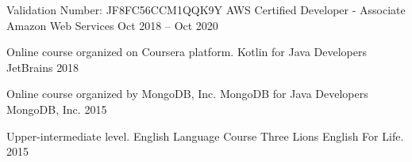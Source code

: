 

\begin{cventries}

  \cventry
    {Validation Number: JF8FC56CCM1QQK9Y} %
    {AWS Certified Developer - Associate} %
    {Amazon Web Services} %
    {Oct 2018 – Oct 2020} %
    {}
   
    
  \cventry
    {Online course organized on Coursera platform. } %
    {Kotlin for Java Developers} %
    {JetBrains} %
    {2018} %
    {}
    
  \cventry
    {Online course organized by MongoDB, Inc. } %
    {MongoDB for Java Developers} %
    {MongoDB, Inc.} %
    {2015} %
    {}
    
  \cventry
    {Upper-intermediate level.} %
    {English Language Course} %
    {Three Lions English For Life.} %
    {2015} %
    {}

\end{cventries}
